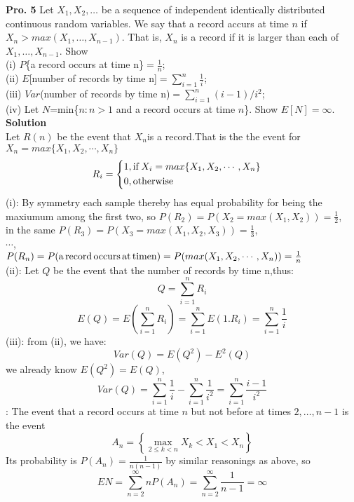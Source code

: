 \documentclass[12pt,onecolumn,journal]{IEEEtran}
\newcommand{\RNum}[1]{\expandafter{\romannumeral #1\relax}}
\begin{document}
\textbf{Pro. 5} Let $X_1, X_2, \ldots$ be a sequence of independent identically distributed continuous random variables. We say that a record accurs at time $n$ if $X_n>max(X_1,\ldots,X_{n-1})$. That is, $X_n$ is a record if it is larger than each of $X_1,\ldots,X_{n-1}$. Show\\
(i) $P$\{a record occurs at time n\}$=\frac{1}{n}$;\\
(ii) $E$[number of records by time n]$=\sum^n_{i=1}{\frac{1}{i}}$;\\
(iii) $Var$(number of records by time n)$=\sum^n_{i=1}{(i-1)/i^2}$;\\
(iv) Let $N$=min\{$n:n>1$ and a record occurs at time $n$\}. Show $E[N]=\infty$.
\\
\textbf{Solution}
\\
\textcolor[rgb]{1,0,0}
{
Let $R(n)$ be the event that $X_n$is a record.That is the the event for$X_n=max\{X_1,X_2,\cdots,X_n\}$\\
\[
R_i=\left\{
\begin{aligned}
&1, {\rm if}\,X_i=max\{X_1,X_2,\cdots,X_n\}&\\
&0, {\rm otherwise}&\\
\end{aligned}
\right.    
\]
(i): By symmetry each sample thereby has equal probability for being the maxiumum among the first two,
so $P(R_2)=P(X_2=max(X_1,X_2))=\frac{1}{2}$,\\
in the same $P(R_3)=P(X_3=max(X_1,X_2,X_3))=\frac{1}{3}$,\\
$\cdots$,\\
$P(R_n)=P({\rm a \, record \, occurs \, at \, time n})=P(max(X_1,X_2,\cdots,X_n))=\frac{1}{n}$\\
(ii):
Let $Q$ be the event that the number of records by time n,thus:
\[Q=\sum_{i=1}^{n}R_i\]
\[E(Q)=E(\sum_{i=1}^{n}R_i)=\sum_{i=1}^{n}E(1.R_i)=\sum_{i=1}^{n}\frac{1}{i}\]
(iii):
from (ii), we have:
\[Var(Q)=E(Q^2)-E^2(Q)\]
we already know $E(Q^2)=E(Q)$,
\[Var(Q)=\sum_{i=1}^{n}\frac{1}{i}-\sum_{i=1}^{n}\frac{1}{i^2}=\sum_{i=1}^{n}\frac{i-1}{i^2}\]
\RNum{4}:
The event that a record occurs at time $n$ but not before at times $2, \ldots, n-1$ is the event
$$
A_{n}=\left\{\max _{2 \leq k<n} X_{k}<X_{1}<X_{n}\right\}
$$
Its probability is $P\left(A_{n}\right)=\frac{1}{n(n-1)}$ by similar reasonings as above, so
$$
E N=\sum_{n=2}^{\infty} n P\left(A_{n}\right)=\sum_{n=2}^{\infty} \frac{1}{n-1}=\infty
$$
}
\end{document}
